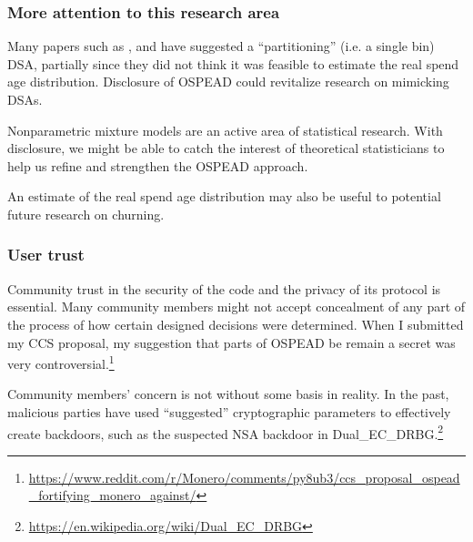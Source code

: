 \documentclass[english]{article}
\begin{document}
\subsubsection{More attention to this research area}

Many papers such as \cite{Egger2022}\cite{Ronge2021}, and \cite{Yu2019}
have suggested a ``partitioning'' (i.e. a single bin) DSA, partially
since they did not think it was feasible to estimate the real spend
age distribution. Disclosure of OSPEAD could revitalize research on
mimicking DSAs.

Nonparametric mixture models are an active area of statistical research.
With disclosure, we might be able to catch the interest of theoretical
statisticians to help us refine and strengthen the OSPEAD approach.

An estimate of the real spend age distribution may also be useful
to potential future research on churning.

\subsubsection{User trust}

Community trust in the security of the code and the privacy of its
protocol is essential. Many community members might not accept concealment
of any part of the process of how certain designed decisions were
determined. When I submitted my CCS proposal, my suggestion that parts
of OSPEAD be remain a secret was very controversial.\footnote{\href{https://www.reddit.com/r/Monero/comments/py8ub3/ccs_proposal_ospead_fortifying_monero_against/}{https://www.reddit.com/r/Monero/comments/py8ub3/ccs\_proposal\_ospead\_fortifying\_monero\_against/}}

Community members' concern is not without some basis in reality. In
the past, malicious parties have used ``suggested'' cryptographic
parameters to effectively create backdoors, such as the suspected
NSA backdoor in Dual\_EC\_DRBG.\footnote{\href{https://en.wikipedia.org/wiki/Dual_EC_DRBG}{https://en.wikipedia.org/wiki/Dual\_EC\_DRBG}}
\end{document}
